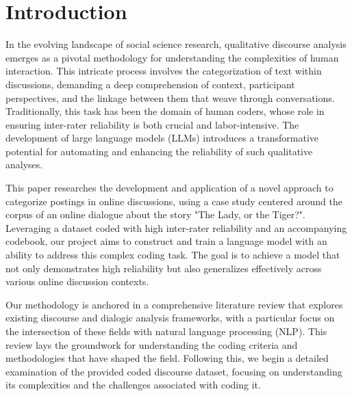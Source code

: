 \documentclass[fleqn,moreauthors,10pt]{ds_report}
\affiliation{\textit{Advisors: Slavko Žitnik}}
\begin{document}
\flushbottom 

\maketitle 

\thispagestyle{empty} 


\section*{Introduction}
In the evolving landscape of social science research, qualitative discourse analysis emerges as a pivotal methodology for understanding the complexities of human interaction. This intricate process involves the categorization of text within discussions, demanding a deep comprehension of context, participant perspectives, and the linkage between them that weave through conversations. Traditionally, this task has been the domain of human coders, whose role in ensuring inter-rater reliability is both crucial and labor-intensive. The development of large language models (LLMs) introduces a transformative potential for automating and enhancing the reliability of such qualitative analyses.

This paper researches the development and application of a novel approach to categorize postings in online discussions, using a case study centered around the corpus of an online dialogue about the story "The Lady, or the Tiger?". Leveraging a dataset coded with high inter-rater reliability and an accompanying codebook, our project aims to construct and train a language model with an ability to address this complex coding task. The goal is to achieve a model that not only demonstrates high reliability but also generalizes effectively across various online discussion contexts.

Our methodology is anchored in a comprehensive literature review that explores existing discourse and dialogic analysis frameworks, with a particular focus on the intersection of these fields with natural language processing (NLP). This review lays the groundwork for understanding the coding criteria and methodologies that have shaped the field. Following this, we begin a detailed examination of the provided coded discourse dataset, focusing on understanding its complexities and the challenges associated with coding it.
\end{document}
